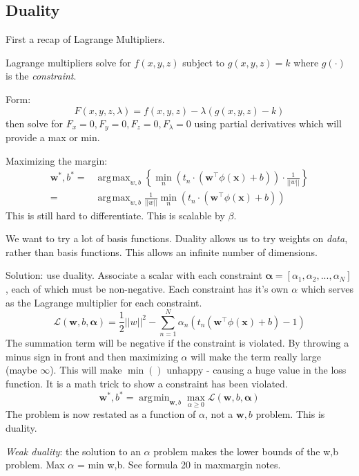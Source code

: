 \documentclass[11pt, oneside]{article}   	%
\DeclareMathOperator*{\argmin}{\arg\!\min}
\DeclareMathOperator*{\argmax}{\arg\!\max}
\begin{document}
\subsection {Duality}
\begin{framed}
First a recap of Lagrange Multipliers.

Lagrange multipliers solve for $f(x,y,z)$ subject to $g(x,y,z) = k$ where $g(\cdot)$ is the \emph{constraint}.

Form:
\[
F(x,y,z,\lambda) = f(x,y,z) - \lambda(g(x,y,z)-k)
\]
then solve for
$F_x = 0, F_y=0, F_z = 0, F_\lambda = 0$ using partial derivatives which will provide a max or min.
\end{framed}

Maximizing the margin:
\begin{align}
\mathbf{w}^*,b^*= &
\argmax_{w,b} \left\{\min_n(t_n\cdot(\mathbf{w}^\intercal\phi(\mathbf{x})+b))\cdot\frac{1}{||w||} \right\}\\
= &\argmax_{w,b} \frac{1}{||w||}\min_n(t_n\cdot(\mathbf{w}^\intercal\phi(\mathbf{x})+b))
\end{align}
This is still hard to differentiate. This is scalable by $\beta$.

We want to try a lot of basis functions. Duality allows us to try weights on \emph{data}, rather than basis functions. This allows an infinite number of dimensions. 

Solution: use duality. Associate a scalar with each constraint $\mathbf{\alpha} = [\alpha_1,\alpha_2,...,\alpha_N]$, each of which must be non-negative. Each constraint has it's own $\alpha$  which serves as the Lagrange multiplier for each constraint.
\[
\mathcal{L}(\mathbf{w},b,\mathbf{\alpha}) = \frac{1}{2}||w||^2-\sum_{n=1}^N \alpha_n(t_n(\mathbf{w}^\intercal\phi(\mathbf{x})+b ) -1)
\]
The summation term will be negative if the constraint is violated. By throwing a minus sign in front and then maximizing $\alpha$ will make the term really large (maybe $\infty$). This will make $\min()$ unhappy - causing a huge value in the loss function. It is a math trick to show a constraint has been violated.
\[
\mathbf{w}^*,b^*= \argmin_{\mathbf{w},b} \max_{\alpha \ge 0} \mathcal{L}(\mathbf{w},b,\mathbf{\alpha})
\]
The problem is now restated as a function of $\alpha$, not a $\mathbf{w},b$ problem. This is duality.

\emph{Weak duality}: the solution to an $\alpha$ problem makes the lower bounds of the w,b problem. Max $\alpha$ = min w,b. See formula 20 in maxmargin notes.
\end{document}
